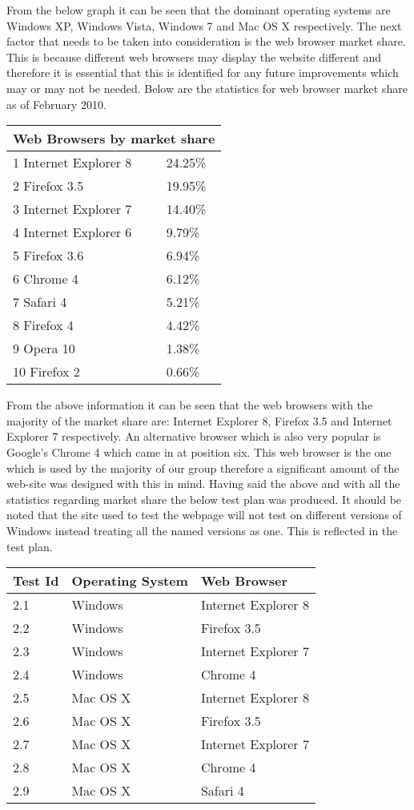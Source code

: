 From the below graph it can be seen that the dominant operating systems are Windows XP, 
Windows Vista, Windows 7 and Mac OS X respectively.
The next factor that needs to be taken into consideration is the web browser market share. 
This is because different web browsers may display the website different and therefore it 
is essential that this is identified for any future improvements which may or may not be 
needed. Below are the statistics for web browser market share as of February 2010.
\newline{}

\begin{tabular}{|l|l|}
\hline
\multicolumn{2}{|c|}{Web Browsers by market share} \\
\hline
1 Internet Explorer 8 & 24.25\% \\
2 Firefox 3.5 & 19.95\% \\
3 Internet Explorer 7 & 14.40\% \\
4 Internet Explorer 6 & 9.79\% \\
5 Firefox 3.6 & 6.94\% \\
6 Chrome 4 & 6.12\% \\
7 Safari 4 & 5.21\% \\
8 Firefox 4 & 4.42\% \\
9 Opera 10 & 1.38\% \\
10 Firefox 2 & 0.66\% \\
\hline
\end{tabular}
\newline{}
\newline{}
From the above information it can be seen that the web browsers with the majority of the 
market share are: Internet Explorer 8, Firefox 3.5 and Internet Explorer 7 respectively. 
An alternative browser which is also very popular is Google’s Chrome 4 which came in at 
position six. This web browser is the one which is used by the majority of our group 
therefore a significant amount of the web-site was designed with this in mind. Having said 
the above and with all the statistics regarding market share the below test plan was 
produced. It should be noted that the site used to test the webpage will not test on 
different versions of Windows instead treating all the named versions as one. This is 
reflected in the test plan.
\newline{}
\newline{}
\begin{tabular}{|l|l|l|}
\hline
Test Id & Operating System & Web Browser \\
\hline
2.1 & Windows & Internet Explorer 8 \\
2.2 & Windows & Firefox 3.5 \\
2.3 & Windows & Internet Explorer 7 \\
2.4 & Windows & Chrome 4 \\
2.5 & Mac OS X & Internet Explorer 8 \\
2.6 & Mac OS X & Firefox 3.5 \\
2.7 & Mac OS X & Internet Explorer 7 \\
2.8 & Mac OS X & Chrome 4 \\
2.9 & Mac OS X & Safari 4 \\
\hline
\end{tabular}
